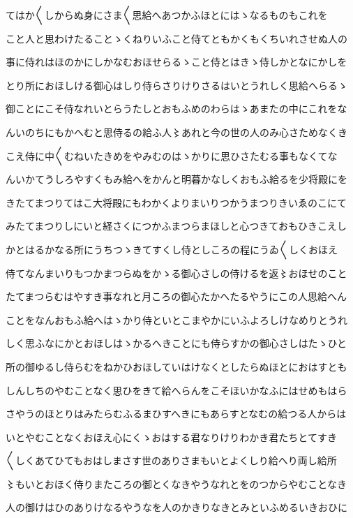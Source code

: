 \documentclass[a4paper,11pt,landscape]{ltjtarticle}
\begin{document}
てはか〱しからぬ身にさま〱思給へあつかふほとにはゝなるものもこれを
\par\medskip
こと人と思わけたることゝくねりいふこと侍てともかくもくちいれさせぬ人の
\par\medskip
事に侍れはほのかにしかなむおほせらるゝこと侍とはきゝ侍しかとなにかしを
\par\medskip
とり所におほしける御心はしり侍らさりけりさるはいとうれしく思給へらるゝ
\par\medskip
御ことにこそ侍なれいとらうたしとおもふめのわらはゝあまたの中にこれをな
\par\medskip
んいのちにもかへむと思侍るの給ふ人〻あれと今の世の人のみ心さためなくき
\par\medskip
こえ侍に中〱むねいたきめをやみむのはゝかりに思ひさたむる事もなくてな
\par\medskip
んいかてうしろやすくもみ給へをかんと明暮かなしくおもふ給るを少将殿にを
\par\medskip
きたてまつりてはこ大将殿にもわかくよりまいりつかうまつりきいゑのこにて
\par\medskip
みたてまつりしにいと経さくにつかふまつらまほしと心つきておもひきこえし
\par\medskip
かとはるかなる所にうちつゝきてすくし侍としころの程にうゐ〱しくおほえ
\par\medskip
侍てなんまいりもつかまつらぬをかゝる御心さしの侍けるを返〻おほせのこと
\par\medskip
たてまつらむはやすき事なれと月ころの御心たかへたるやうにこの人思給へん
\par\medskip
ことをなんおもふ給へはゝかり侍といとこまやかにいふよろしけなめりとうれ
\par\medskip
しく思ふなにかとおほしはゝかるへきことにも侍らすかの御心さしはたゝひと
\par\medskip
所の御ゆるし侍らむをねかひおほしていはけなくとしたらぬほとにおはすとも
\par\medskip
しんしちのやむことなく思ひをきて給へらんをこそほいかなふにはせめもはら
\par\medskip
さやうのほとりはみたらむふるまひすへきにもあらすとなむの給つる人からは
\par\medskip
いとやむことなくおほえ心にくゝおはする君なりけりわかき君たちとてすき
\par\medskip
〱しくあてひてもおはしまさす世のありさまもいとよくしり給へり両し給所
\par\medskip
〻もいとおほく侍りまたころの御とくなきやうなれとをのつからやむことなき
\par\medskip
人の御けはひのありけなるやうなを人のかきりなきとみといふめるいきおひに
\end{document}
